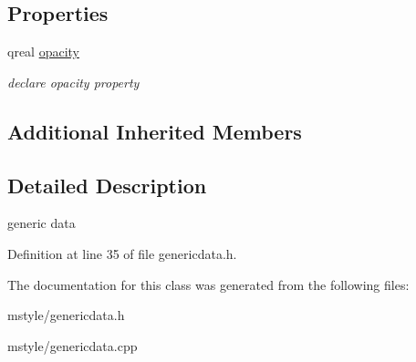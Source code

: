 \subsection*{Properties}
\begin{DoxyCompactItemize}
\item 
\mbox{\label{class_generic_data_aa403df71e769a5521f979ad8cff75137}} 
qreal \hyperlink{class_generic_data_aa403df71e769a5521f979ad8cff75137}{opacity}
\begin{DoxyCompactList}\small\item\em declare opacity property \end{DoxyCompactList}\end{DoxyCompactItemize}
\subsection*{Additional Inherited Members}


\subsection{Detailed Description}
generic data 

Definition at line 35 of file genericdata.\+h.



The documentation for this class was generated from the following files\+:\begin{DoxyCompactItemize}
\item 
mstyle/genericdata.\+h\item 
mstyle/genericdata.\+cpp\end{DoxyCompactItemize}
